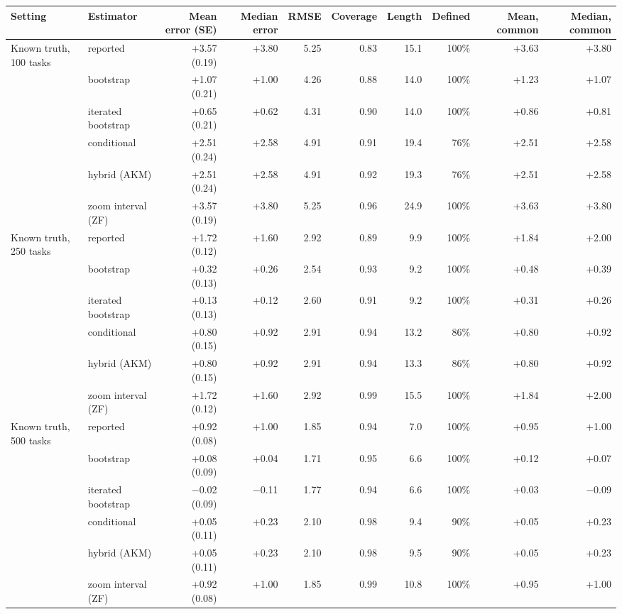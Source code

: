 \begin{tabular}{llrrrrrrrr}
\toprule
Setting & Estimator & Mean error (SE) & Median error & RMSE & Coverage & Length & Defined & Mean, common & Median, common \\
\midrule
Known truth, 100 tasks & reported & +3.57 (0.19) & +3.80 & 5.25 & 0.83 & 15.1 & 100\% & +3.63 & +3.80 \\
 & bootstrap & +1.07 (0.21) & +1.00 & 4.26 & 0.88 & 14.0 & 100\% & +1.23 & +1.07 \\
 & iterated bootstrap & +0.65 (0.21) & +0.62 & 4.31 & 0.90 & 14.0 & 100\% & +0.86 & +0.81 \\
 & conditional & +2.51 (0.24) & +2.58 & 4.91 & 0.91 & 19.4 & 76\% & +2.51 & +2.58 \\
 & hybrid (AKM) & +2.51 (0.24) & +2.58 & 4.91 & 0.92 & 19.3 & 76\% & +2.51 & +2.58 \\
 & zoom interval (ZF) & +3.57 (0.19) & +3.80 & 5.25 & 0.96 & 24.9 & 100\% & +3.63 & +3.80 \\
\addlinespace
Known truth, 250 tasks & reported & +1.72 (0.12) & +1.60 & 2.92 & 0.89 & 9.9 & 100\% & +1.84 & +2.00 \\
 & bootstrap & +0.32 (0.13) & +0.26 & 2.54 & 0.93 & 9.2 & 100\% & +0.48 & +0.39 \\
 & iterated bootstrap & +0.13 (0.13) & +0.12 & 2.60 & 0.91 & 9.2 & 100\% & +0.31 & +0.26 \\
 & conditional & +0.80 (0.15) & +0.92 & 2.91 & 0.94 & 13.2 & 86\% & +0.80 & +0.92 \\
 & hybrid (AKM) & +0.80 (0.15) & +0.92 & 2.91 & 0.94 & 13.3 & 86\% & +0.80 & +0.92 \\
 & zoom interval (ZF) & +1.72 (0.12) & +1.60 & 2.92 & 0.99 & 15.5 & 100\% & +1.84 & +2.00 \\
\addlinespace
Known truth, 500 tasks & reported & +0.92 (0.08) & +1.00 & 1.85 & 0.94 & 7.0 & 100\% & +0.95 & +1.00 \\
 & bootstrap & +0.08 (0.09) & +0.04 & 1.71 & 0.95 & 6.6 & 100\% & +0.12 & +0.07 \\
 & iterated bootstrap & $-$0.02 (0.09) & $-$0.11 & 1.77 & 0.94 & 6.6 & 100\% & +0.03 & $-$0.09 \\
 & conditional & +0.05 (0.11) & +0.23 & 2.10 & 0.98 & 9.4 & 90\% & +0.05 & +0.23 \\
 & hybrid (AKM) & +0.05 (0.11) & +0.23 & 2.10 & 0.98 & 9.5 & 90\% & +0.05 & +0.23 \\
 & zoom interval (ZF) & +0.92 (0.08) & +1.00 & 1.85 & 0.99 & 10.8 & 100\% & +0.95 & +1.00 \\

\end{tabular}
